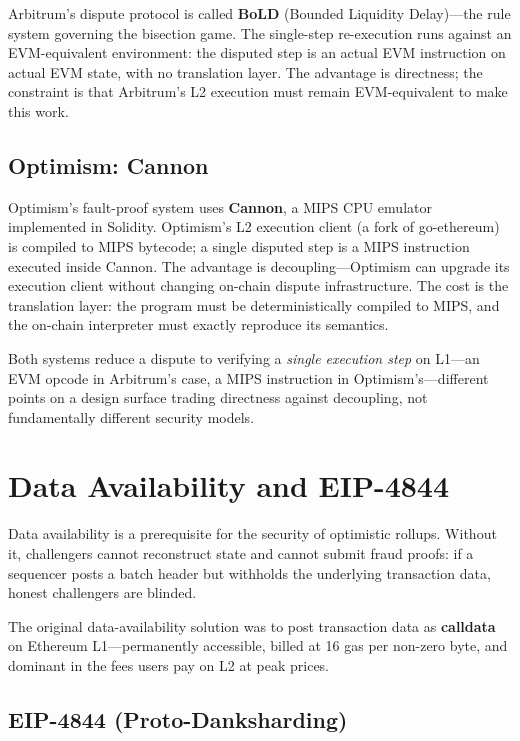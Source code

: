 \documentclass[11pt,letterpaper]{article}
\begin{document}
Arbitrum's dispute protocol is called \textbf{BoLD} (Bounded Liquidity Delay)---the rule system governing the bisection game. The single-step re-execution runs against an EVM-equivalent environment: the disputed step is an actual EVM instruction on actual EVM state, with no translation layer. The advantage is directness; the constraint is that Arbitrum's L2 execution must remain EVM-equivalent to make this work.

\subsection{Optimism: Cannon}

Optimism's fault-proof system uses \textbf{Cannon}, a MIPS CPU emulator implemented in Solidity. Optimism's L2 execution client (a fork of go-ethereum) is compiled to MIPS bytecode; a single disputed step is a MIPS instruction executed inside Cannon. The advantage is decoupling---Optimism can upgrade its execution client without changing on-chain dispute infrastructure. The cost is the translation layer: the program must be deterministically compiled to MIPS, and the on-chain interpreter must exactly reproduce its semantics.

Both systems reduce a dispute to verifying a \emph{single execution step} on L1---an EVM opcode in Arbitrum's case, a MIPS instruction in Optimism's---different points on a design surface trading directness against decoupling, not fundamentally different security models.

\section{Data Availability and EIP-4844}

Data availability is a prerequisite for the security of optimistic rollups. Without it, challengers cannot reconstruct state and cannot submit fraud proofs: if a sequencer posts a batch header but withholds the underlying transaction data, honest challengers are blinded.

The original data-availability solution was to post transaction data as \textbf{calldata} on Ethereum L1---permanently accessible, billed at 16 gas per non-zero byte, and dominant in the fees users pay on L2 at peak prices.

\subsection{EIP-4844 (Proto-Danksharding)}
\end{document}

